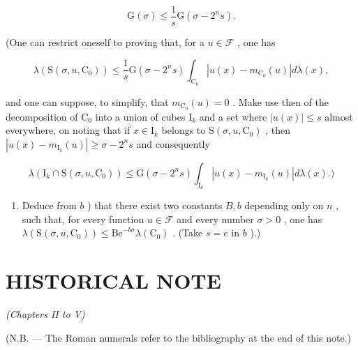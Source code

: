 \[
\mathrm{G} (\sigma) \leqslant \frac {1}{s} \mathrm{G} (\sigma - 2 ^ {n} s).
\]

(One can restrict oneself to proving that, for a \(u \in \mathcal{F}\) , one has

\[
\lambda \left(\mathrm{S} (\sigma , u, \mathrm{C} _ {0})\right) \leqslant \frac {1}{s} \mathrm{G} (\sigma - 2 ^ {n} s) \int_ {\mathrm{C} _ {0}} | u (x) - m _ {\mathrm{C} _ {0}} (u) | d \lambda (x),
\]

and one can suppose, to simplify, that \(m_{\mathrm{C}_0}(u) = 0\) . Make use then of the decomposition of \(\mathrm{C}_0\) into a union of cubes \(\mathrm{I}_k\) and a set where \(|u(x)| \leqslant s\) almost everywhere, on noting that if \(x \in \mathrm{I}_k\) belongs to \(\mathrm{S}(\sigma, u, \mathrm{C}_0)\) , then \(|u(x) - m_{\mathrm{I}_k}(u)| \geqslant \sigma - 2^n s\) and consequently

\[
\lambda \left(\mathrm{I} _ {k} \cap \mathrm{S} (\sigma , u, \mathrm{C} _ {0})\right) \leqslant \mathrm{G} (\sigma - 2 ^ {n} s) \int_ {\mathrm{I} _ {k}} | u (x) - m _ {\mathrm{I} _ {k}} (u) | d \lambda (x). \Big)
\]

\begin{enumerate}
\def\labelenumi{\alph{enumi})}
\setcounter{enumi}{2}
\tightlist
\item
  Deduce from \(b\) ) that there exist two constants \(B, b\) depending only on \(n\) , such that, for every function \(u \in \mathcal{F}\) and every number \(\sigma > 0\) , one has \(\lambda(\mathrm{S}(\sigma, u, \mathrm{C}_0)) \leqslant \mathrm{Be}^{-b\sigma}\lambda(\mathrm{C}_0)\) . (Take \(s = e\) in \(b\) ).)
\end{enumerate}

\chapter*{HISTORICAL NOTE}
{}

\begin{center}
\textit{(Chapters II to V)}
\end{center}

(N.B. --- The Roman numerals refer to the bibliography at the end of this note.)

